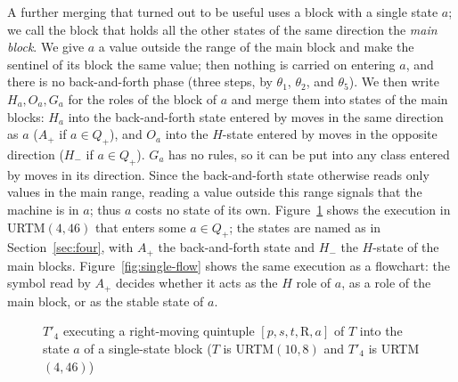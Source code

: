 \documentclass{article}
\theoremstyle{definition}
\theoremstyle{remark}
\begin{document}
A further merging that turned out to be useful uses a block with a single state $a$; we call the block that holds all the other states of the same direction the \emph{main block}.
We give $a$ a value outside the range of the main block and make the sentinel of its block the same value; then nothing is carried on entering $a$, and there is no back-and-forth phase (three steps, by $\theta_1$, $\theta_2$, and $\theta_5$).
We then write $H_a,O_a,G_a$ for the roles of the block of $a$ and merge them into states of the main blocks: $H_a$ into the back-and-forth state entered by moves in the same direction as $a$ ($A_+$ if $a\in Q_+$), and $O_a$ into the $H$-state entered by moves in the opposite direction ($H_-$ if $a\in Q_+$). $G_a$ has no rules, so it can be put into any class entered by moves in its direction.
Since the back-and-forth state otherwise reads only values in the main range, reading a value outside this range signals that the machine is in $a$; thus $a$ costs no state of its own.
Figure~\ref{fig:single} shows the execution in URTM$(4,46)$ that enters some $a\in Q_+$; the states are named as in Section~\ref{sec:four}, with $A_+$ the back-and-forth state and $H_-$ the $H$-state of the main blocks.
Figure~\ref{fig:single-flow} shows the same execution as a flowchart: the symbol read by $A_+$ decides whether it acts as the $H$ role of $a$, as a role of the main block, or as the stable state of $a$.
\begin{figure}[tb]
\centering
{}
\caption{$T'_4$ executing a right-moving quintuple $[p,s,t,\mathrm{R},a]$ of $T$ into the state $a$ of a single-state block ($T$ is URTM$(10,8)$ and $T'_4$ is URTM$(4,46)$)}
\label{fig:single}
\end{figure}
\end{document}
